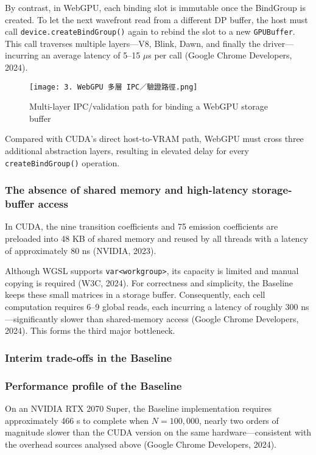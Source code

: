 \documentclass[PhD]{PHlab-thesis}
\begin{document}
By contrast, in WebGPU, each binding slot is immutable once the BindGroup is created. To let the next wavefront read from a different DP buffer, the host must call \texttt{device.createBindGroup()} again to rebind the slot to a new \texttt{GPUBuffer}.  
This call traverses multiple layers—V8, Blink, Dawn, and finally the driver—incurring an average latency of 5–15 $\mu$s per call (Google Chrome Developers, 2024).

\begin{figure}[htbp]
    \centering
    \texttt{[image: 3. WebGPU 多層 IPC／驗證路徑.png]}
    \caption{Multi-layer IPC/validation path for binding a WebGPU storage buffer}
    \label{fig:webgpu-ipc-validation}
\end{figure}

Compared with CUDA's direct host-to-VRAM path, WebGPU must cross three additional abstraction layers, resulting in elevated delay for every \texttt{createBindGroup()} operation.

\subsubsection{The absence of shared memory and high-latency storage-buffer access}
In CUDA, the nine transition coefficients and 75 emission coefficients are preloaded into 48 KB of shared memory and reused by all threads with a latency of approximately 80 ns (NVIDIA, 2023).

Although WGSL supports \texttt{var<workgroup>}, its capacity is limited and manual copying is required (W3C, 2024).  
For correctness and simplicity, the Baseline keeps these small matrices in a storage buffer. Consequently, each cell computation requires 6–9 global reads, each incurring a latency of roughly 300 ns—significantly slower than shared-memory access (Google Chrome Developers, 2024). This forms the third major bottleneck.

\subsubsection{Interim trade-offs in the Baseline}

\subsubsection{Performance profile of the Baseline}
On an NVIDIA RTX 2070 Super, the Baseline implementation requires approximately 466 s to complete when $N = 100{,}000$, nearly two orders of magnitude slower than the CUDA version on the same hardware—consistent with the overhead sources analysed above (Google Chrome Developers, 2024).
\end{document}
